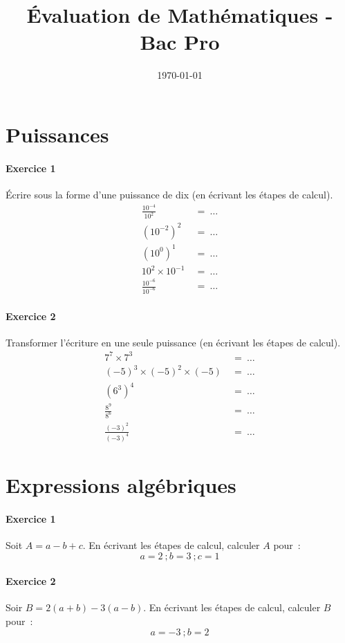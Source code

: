 \documentclass[a4paper]{article}
\begin{document}
  \title{Évaluation de Mathématiques - Bac Pro}
  \author{}
  \date{\today}
  \maketitle
  
  \section*{Puissances}
  \paragraph{Exercice 1}
  Écrire sous la forme d'une puissance de dix (en écrivant les étapes de calcul).
  \begin{align*}
    \frac{10^{-4}}{10^2} &\ = \ \dots\\
    (10^{-2})^2 &\ = \ \dots\\
    (10^0)^1 &\ = \ \dots\\
    10^2 \times 10^{-1} &\ = \ \dots\\
    \frac{10^{-6}}{10^{-6}} &\ = \ \dots
  \end{align*}

  \paragraph{Exercice 2}
  Transformer l'écriture en une seule puissance (en écrivant les étapes de calcul).
  \begin{align*}
    7^7 \times 7^3 &\ =\ \dots\\
    (-5)^3 \times (-5)^2 \times (-5) &\ =\ \dots\\
    (6^3)^4 &\ =\ \dots\\
    \frac{8^9}{8^6} &\ =\ \dots\\
    \frac{(-3)^2}{(-3)^4} &\ =\ \dots
  \end{align*}

  \section*{Expressions algébriques}
  \paragraph{Exercice 1}
  Soit $A = a - b + c$. En écrivant les étapes de calcul, calculer $A$ pour~:
  \[
    a = 2~; b = 3~; c = 1
  \]
  \vspace{3cm}

  \paragraph{Exercice 2}
  Soir $B = 2 (a + b) - 3 (a - b)$. En écrivant les étapes de calcul, calculer $B$ pour~:
  \[
    a = -3~; b = 2
  \]
  \vspace{3cm}
\end{document}

